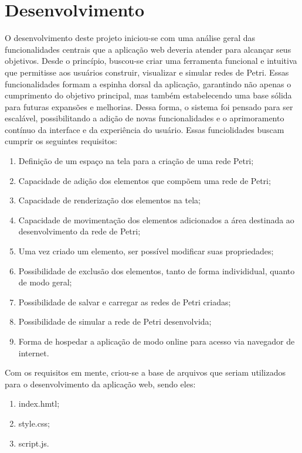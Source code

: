 \documentclass[
	12pt,				%
	openright,			%
	oneside,			%
	a4paper,			%
	english,			%
	brazil				%
	]{abntex2}
\theoremstyle{doispontos}
\begin{document}
\chapter{Desenvolvimento} \label{cap:desenvolvimento}

O desenvolvimento deste projeto iniciou-se com uma análise geral das funcionalidades centrais que a aplicação web deveria atender para alcançar seus objetivos. Desde o princípio, buscou-se criar uma ferramenta funcional e intuitiva que permitisse aos usuários construir, visualizar e simular redes de Petri. Essas funcionalidades formam a espinha dorsal da aplicação, garantindo não apenas o cumprimento do objetivo principal, mas também estabelecendo uma base sólida para futuras expansões e melhorias. Dessa forma, o sistema foi pensado para ser escalável, possibilitando a adição de novas funcionalidades e o aprimoramento contínuo da interface e da experiência do usuário. Essas funciolidades buscam cumprir os seguintes requisitos: 

\begin{enumerate}
	\item Definição de um espaço na tela para a criação de uma rede Petri;
	\item Capacidade de adição dos elementos que compõem uma rede de Petri;
	\item Capacidade de renderização dos elementos na tela;
	\item Capacidade de movimentação dos elementos adicionados a área destinada ao desenvolvimento da rede de Petri;
	\item Uma vez criado um elemento, ser possível modificar suas propriedades;
	\item Possibilidade de exclusão dos elementos, tanto de forma individidual, quanto de modo geral;
	\item Possibilidade de salvar e carregar as redes de Petri criadas;
	\item Possibilidade de simular a rede de Petri desenvolvida;
	\item Forma de hospedar a aplicação de modo online para acesso via navegador de internet.
\end{enumerate}

Com os requisitos em mente, criou-se a base de arquivos que seriam utilizados para o desenvolvimento da aplicação web, sendo eles: 

\begin{enumerate}
	\item index.hmtl;
	\item style.css;
	\item script.js.
\end{enumerate}
\end{document}

